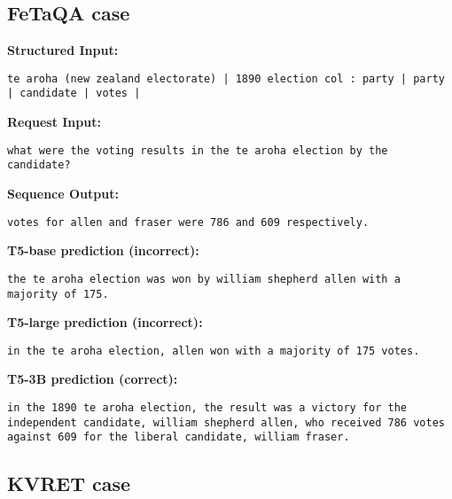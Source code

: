 \documentclass[11pt]{article}
\begin{document}
\subsection{FeTaQA case}
\label{app:fetaqa_case}
\textbf{Structured Input:} 
\begin{lstlisting}
te aroha (new zealand electorate) | 1890 election col : party | party | candidate | votes | \end{lstlisting}
\textbf{Request Input:} 
\begin{lstlisting}
what were the voting results in the te aroha election by the candidate?
\end{lstlisting}
\textbf{Sequence Output:} 
\begin{lstlisting}
votes for allen and fraser were 786 and 609 respectively.
\end{lstlisting}
\textbf{T5-base prediction (incorrect):} 
\begin{lstlisting}
the te aroha election was won by william shepherd allen with a majority of 175.
\end{lstlisting}
\textbf{T5-large prediction (incorrect):} 
\begin{lstlisting}
in the te aroha election, allen won with a majority of 175 votes.
\end{lstlisting}
\textbf{T5-3B prediction (correct):} 
\begin{lstlisting}
in the 1890 te aroha election, the result was a victory for the independent candidate, william shepherd allen, who received 786 votes against 609 for the liberal candidate, william fraser.
\end{lstlisting}

\subsection{KVRET case}
\end{document}

